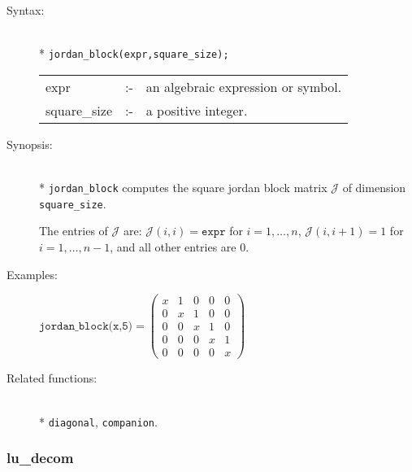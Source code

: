 \begin{description}
\item[Syntax:]\mbox{}\\*
\texttt{jordan\_block(expr,square\_size);}\\[2mm]
\begin{tabular}{l l l}
expr        &:-& an algebraic expression or symbol. \\
square\_size &:-& a positive integer.
\end{tabular}

\item[Synopsis:]\mbox{}\\*
\texttt{jordan\_block} computes the square jordan block matrix $\mathcal{J}$
                of dimension \texttt{square\_size}.

The entries of $\mathcal{J}$ are: $\mathcal{J}(i,i) = \texttt{expr}$ for
                $i=1,\ldots,n$, $\mathcal{J}(i,i+1) = 1$ for $i=1,\ldots,n-1$,
                and all other entries are 0.

\item[Examples:]\nopagebreak
\begin{flushleft}
\(
\texttt{jordan\_block(x,5)}  =
 \begin{pmatrix} x & 1 & 0 & 0 & 0 \\ 0 & x & 1 & 0 & 0 \\ 0
& 0 & x & 1 & 0 \\ 0 & 0 & 0 & x & 1 \\ 0 & 0 & 0 & 0 & x
 \end{pmatrix}
\)
\end{flushleft}

\item[Related functions:]\mbox{}\\*
\texttt{diagonal}, \texttt{companion}.
\end{description}


\subsubsection{lu\_decom}
\label{linalg:lu_decom}

